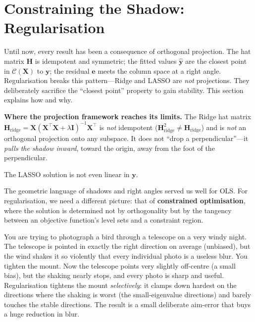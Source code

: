 \documentclass[11pt,a4paper]{article}
\theoremstyle{plain}
\theoremstyle{definition}
\newcommand{\yhat}{\hat{\bm{y}}}
\newcommand{\bX}{\bm{X}}
\newcommand{\by}{\bm{y}}
\newcommand{\be}{\bm{e}}
\newcommand{\bH}{\bm{H}}
\newcommand{\bI}{\bm{I}}
\newcommand{\Col}{\mathcal{C}}
\begin{document}
\section{Constraining the Shadow: Regularisation}\label{sec:regularisation}

Until now, every result has been a consequence of orthogonal projection.
The hat matrix $\bH$ is idempotent and symmetric; the fitted values
$\yhat$ are the closest point in $\Col(\bX)$ to $\by$; the residual
$\be$ meets the column space at a right angle.
Regularisation breaks this pattern---Ridge and LASSO are \emph{not}
projections.
They deliberately sacrifice the ``closest point'' property to gain
stability.
This section explains how and why.

\begin{warning}
\textbf{Where the projection framework reaches its limits.}
The Ridge hat matrix
$\bH_{\text{ridge}} = \bX(\bX^\top\bX+\lambda\bI)^{-1}\bX^\top$
is \emph{not} idempotent
($\bH_{\text{ridge}}^2 \neq \bH_{\text{ridge}}$) and is \emph{not}
an orthogonal projection onto any subspace.
It does not ``drop a perpendicular''---it \emph{pulls the shadow
inward}, toward the origin, away from the foot of the perpendicular.

The LASSO solution is not even linear in $\by$.

The geometric language of shadows and right angles served us well for
OLS\@.  For regularisation, we need a different picture: that of
\textbf{constrained optimisation}, where the solution is determined
not by orthogonality but by the tangency between an objective function's
level sets and a constraint region.
\end{warning}

\medskip
\begin{toystory}
You are trying to photograph a bird through a telescope on a very windy
night.  The telescope is pointed in exactly the right direction on
average (unbiased), but the wind shakes it so violently that every
individual photo is a useless blur.  You tighten the mount.  Now the
telescope points very slightly off-centre (a small bias), but the
shaking nearly stops, and every photo is sharp and useful.
Regularisation tightens the mount \emph{selectively}: it clamps down
hardest on the directions where the shaking is worst (the
small-eigenvalue directions) and barely touches the stable directions.
The result is a small deliberate aim-error that buys a huge reduction
in blur.
\end{toystory}
\end{document}
